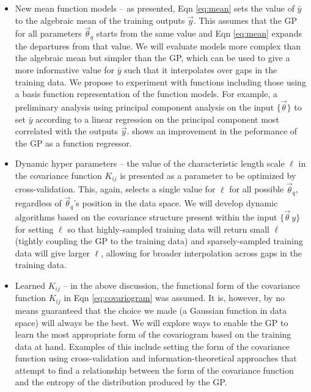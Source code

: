 \documentclass[prd,nofootbib,floatfix,11pt,tightenlines]{revtex4}
\begin{document}
\vspace{.5\baselineskip}
\begin{itemize}
\item New mean function models -- as presented,
Eqn \ref{eq:mean} sets the value of $\bar{y}$ to the algebraic mean of the
training outputs $\vec{y}$.  This assumes that the GP for all 
parameters $\vec{\theta}_q$
starts from the same value and Eqn \ref{eq:mean} expands the
departures from that value.  
We will evaluate models more complex than the algebraic
mean but simpler than the GP, which can be used to give a more informative value
for $\bar{y}$ such that it interpolates over gaps in the training data.  We propose
to experiment with functions including those using a basis
function representation of the function models. For example, a preliminary analysis using
 principal component
analysis on the input $\{\vec{\theta}\}$ to set $\bar{y}$ according to a linear
regression on the principal component most correlated with the outputs $\vec{y}$.
shows an  improvement in the peformance of
the GP as a function regressor.

\item Dynamic hyper parameters -- the value of the characteristic
length scale $\ell$ in the covariance function $K_{ij}$ is presented
as a parameter to be optimized by cross-validation.  This, again, selects a
single value for $\ell$ for all possible $\vec{\theta}_q$, regardless of
$\vec{\theta}_q$'s position in the data space.  We will develop 
dynamic algorithms based on the covariance
structure present within the input $\{\vec{\theta}\,y\}$  
for setting $\ell$ so that highly-sampled 
training data will
return small $\ell$ (tightly coupling the GP to the training data) and
sparsely-sampled training data will give larger $\ell$, allowing for broader
interpolation across gaps in the training data.

\item Learned $K_{ij}$ -- in the above discussion, the functional form of
the covariance function
$K_{ij}$ in Eqn \ref{eq:covariogram}
was assumed.  
It is, however, by no means guaranteed that the choice we made (a Gaussian
function in data space) will always be the best.  
We will explore ways
to enable the GP to learn the most appropriate form of 
the covariogram
based on the training data at hand. Examples of this include setting the
form of the covariance function
using cross-validation and information-theoretical
approaches that attempt to find a relationship between the form of the covariance
function and the entropy of the distribution produced by the GP.
\end{itemize}
\vspace{.5\baselineskip}
\end{document}
